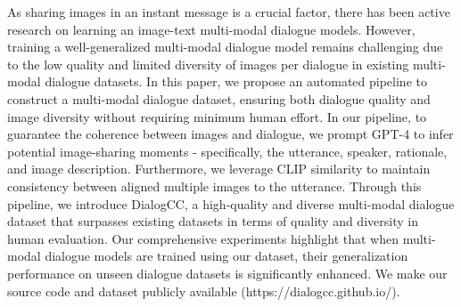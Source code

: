 As sharing images in an instant message is a crucial factor, there has been active research on learning an image-text multi-modal dialogue models. However, training a well-generalized multi-modal dialogue model remains challenging due to the low quality and limited diversity of images per dialogue in existing multi-modal dialogue datasets. In this paper, we propose an automated pipeline to construct a multi-modal dialogue dataset, ensuring both dialogue quality and image diversity without requiring minimum human effort.  In our pipeline, to guarantee the coherence between images and dialogue, we prompt GPT-4 to infer potential image-sharing moments - specifically, the utterance, speaker, rationale, and image description.  Furthermore, we leverage CLIP similarity to maintain consistency between aligned multiple images to the utterance. Through this pipeline, we introduce DialogCC, a high-quality and diverse multi-modal dialogue dataset that surpasses existing datasets in terms of quality and diversity in human evaluation. Our comprehensive experiments highlight that when multi-modal dialogue models are trained using our dataset, their generalization performance on unseen dialogue datasets is significantly enhanced. We make our source code and dataset publicly available (https://dialogcc.github.io/).